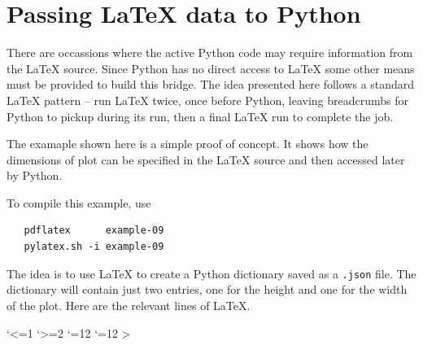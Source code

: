 \documentclass[12pt]{pylatex}
\makeatletter
\def\inches#1{\strip@pt\dimexpr #1*65536/\number\dimexpr1in}
\makeatother
\begin{document}
\section*{Passing LaTeX data to Python}

There are occassions where the active Python code may require information from the LaTeX source. Since Python has no direct access to LaTeX some other means must be provided to build this bridge. The idea presented here follows a standard LaTeX pattern -- run LaTeX twice, once before Python, leaving breadcrumbs for Python to pickup during its run, then a final LaTeX run to complete the job.

The examaple shown here is a simple proof of concept. It shows how the dimensions of plot can be specified in the LaTeX source and then accessed later by Python.

To compile this example, use

\begin{lstlisting}
   pdflatex      example-09
   pylatex.sh -i example-09
\end{lstlisting}

The idea is to use LaTeX to create a Python dictionary saved as a {\tt\small .json} file. The dictionary will contain just two entries, one for the height and one for the width of the plot. Here are the relevant lines of LaTeX.

\vspace{10pt}


\begingroup
\catcode`<=1 \catcode`>=2 \catcode`{=12 \catcode`}=12
\gdef\writebgroup<{> \gdef\writeegroup<}>
\endgroup
\end{document}
